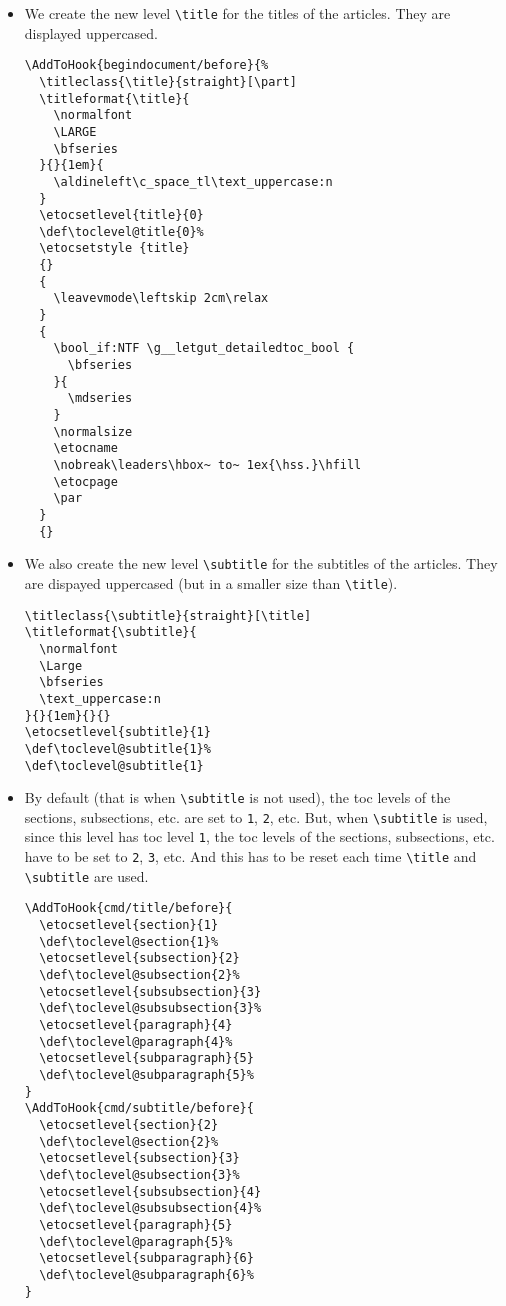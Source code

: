 \documentclass{letgut}
\begin{document}
\begin{itemize}
\item We create the new level \lstinline+\title+ for the titles of the articles. They are
displayed uppercased.

\begin{lstlisting}
\AddToHook{begindocument/before}{%
  \titleclass{\title}{straight}[\part]
  \titleformat{\title}{
    \normalfont
    \LARGE
    \bfseries
  }{}{1em}{
    \aldineleft\c_space_tl\text_uppercase:n
  }
  \etocsetlevel{title}{0}
  \def\toclevel@title{0}%
  \etocsetstyle {title}
  {}
  {
    \leavevmode\leftskip 2cm\relax
  }
  {
    \bool_if:NTF \g__letgut_detailedtoc_bool {
      \bfseries
    }{
      \mdseries
    }
    \normalsize
    \etocname
    \nobreak\leaders\hbox~ to~ 1ex{\hss.}\hfill
    \etocpage
    \par
  }
  {}
\end{lstlisting}
\item We also create the new level \lstinline+\subtitle+ for the subtitles of the
articles. They are dispayed uppercased (but in a smaller size than \lstinline+\title+).
\begin{lstlisting}
\titleclass{\subtitle}{straight}[\title]
\titleformat{\subtitle}{
  \normalfont
  \Large
  \bfseries
  \text_uppercase:n
}{}{1em}{}{}
\etocsetlevel{subtitle}{1}
\def\toclevel@subtitle{1}%
\def\toclevel@subtitle{1}
\end{lstlisting}
\item By default (that is when \lstinline+\subtitle+ is not used), the toc levels of the
sections, subsections, etc. are set to \lstinline+1+, \lstinline+2+, etc. But, when \lstinline+\subtitle+ is
used, since this level has toc level \lstinline+1+, the toc levels of the sections,
subsections, etc. have to be set to \lstinline+2+, \lstinline+3+, etc. And this has to be reset
each time \lstinline+\title+ and  \lstinline+\subtitle+ are used.
\begin{lstlisting}
\AddToHook{cmd/title/before}{
  \etocsetlevel{section}{1}
  \def\toclevel@section{1}%
  \etocsetlevel{subsection}{2}
  \def\toclevel@subsection{2}%
  \etocsetlevel{subsubsection}{3}
  \def\toclevel@subsubsection{3}%
  \etocsetlevel{paragraph}{4}
  \def\toclevel@paragraph{4}%
  \etocsetlevel{subparagraph}{5}
  \def\toclevel@subparagraph{5}%
}
\AddToHook{cmd/subtitle/before}{
  \etocsetlevel{section}{2}
  \def\toclevel@section{2}%
  \etocsetlevel{subsection}{3}
  \def\toclevel@subsection{3}%
  \etocsetlevel{subsubsection}{4}
  \def\toclevel@subsubsection{4}%
  \etocsetlevel{paragraph}{5}
  \def\toclevel@paragraph{5}%
  \etocsetlevel{subparagraph}{6}
  \def\toclevel@subparagraph{6}%
}
\end{lstlisting}


\end{itemize}
\end{document}
